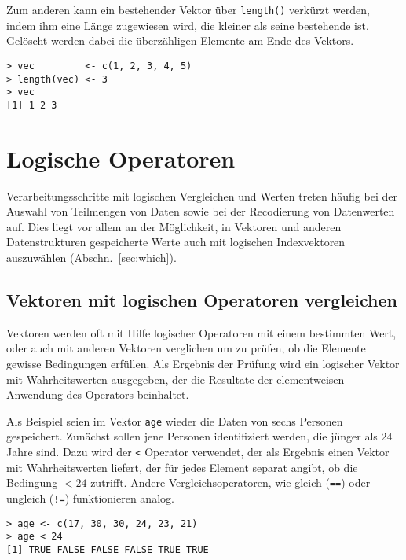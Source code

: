 Zum anderen kann ein bestehender Vektor über \lstinline!length()! verkürzt werden, indem ihm eine Länge zugewiesen wird, die kleiner als seine bestehende ist. Gelöscht werden dabei die überzähligen Elemente am Ende des Vektors.
\begin{lstlisting}
> vec         <- c(1, 2, 3, 4, 5)
> length(vec) <- 3
> vec
[1] 1 2 3
\end{lstlisting}

\section{Logische Operatoren}

Verarbeitungsschritte mit logischen Vergleichen und Werten treten häufig bei der Auswahl von Teilmengen von Daten sowie bei der Recodierung von Datenwerten auf. Dies liegt vor allem an der Möglichkeit, in Vektoren und anderen Datenstrukturen gespeicherte Werte auch mit logischen Indexvektoren auszuwählen (Abschn.\ \ref{sec:which}).

\subsection{Vektoren mit logischen Operatoren vergleichen}
\label{sec:compare_vec_logical}

Vektoren werden oft mit Hilfe logischer Operatoren mit einem bestimmten Wert, oder auch mit anderen Vektoren verglichen um zu prüfen, ob die Elemente gewisse Bedingungen erfüllen. Als Ergebnis der Prüfung wird ein logischer Vektor mit Wahrheitswerten ausgegeben, der die Resultate der elementweisen Anwendung des Operators beinhaltet.

Als Beispiel seien im Vektor \lstinline!age! wieder die Daten von sechs Personen gespeichert. Zunächst sollen jene Personen identifiziert werden, die jünger als $24$ Jahre sind. Dazu wird der \lstinline!<! Operator verwendet, der als Ergebnis einen Vektor mit Wahrheitswerten liefert, der für jedes Element separat angibt, ob die Bedingung $< 24$ zutrifft. Andere Vergleichsoperatoren, wie gleich (\lstinline!==!) oder ungleich (\lstinline|!=|) funktionieren analog.
\begin{lstlisting}
> age <- c(17, 30, 30, 24, 23, 21)
> age < 24
[1] TRUE FALSE FALSE FALSE TRUE TRUE
\end{lstlisting}

